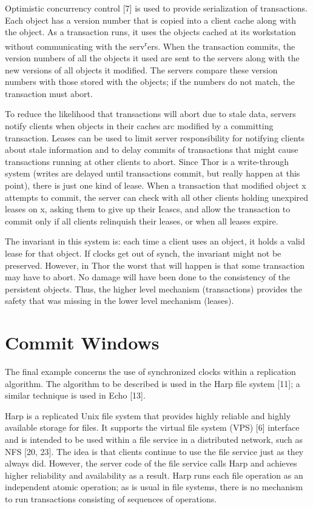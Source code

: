 \documentclass[a4paper,11pt,notitlepage,twoside,openright]{article}
\begin{document}
Optimistic concurrency control {[}7{]} is used to provide serialization
of transactions. Each object has a version number that is copied into a
client cache along with the object. As a transaction runs, it uses the
objects cached at its workstation without communicating with the
serv\textsuperscript{r}ers. When the transaction commits, the version
numbers of all the objects it used are sent to the servers along with
the new versions of all objects it modified. The servers compare these
version numbers with those stored with the objects; if the numbers do
not match, the transaction must abort.

To reduce the likelihood that transactions will abort due to stale data,
servers notify clients when objects in their caches arc modified by a
committing transaction. Leases can be used to limit server
responsibility for notifying clients about stale information and to
delay commits of transactions that might cause transactions running at
other clients to abort. Since Thor is a write-through system (writes are
delayed until transactions commit, but really happen at this point),
there is just one kind of lease. When a transaction that modified object
x attempts to commit, the server can check with all other clients
holding unexpired leases on x, asking them to give up their Icascs, and
allow the transaction to commit only if all clients relinquish their
leases, or when all leases expire.

The invariant in this system is: each time a client uses an object, it
holds a valid lease for that object. If clocks get out of synch, the
invariant might not be preserved. However, in Thor the worst that will
happen is that some transaction may have to abort. No damage will have
been done to the consistency of the persistent objects. Thus, the higher
level mechanism (transactions) provides the safety that was missing in
the lower level mechanism (leases).


\hypertarget{commit-windows}{%
\section{Commit Windows}\label{commit-windows}}


The final example concerns the use of synchronized clocks within a
replication algorithm. The algorithm to be described is used in the Harp
file system {[}11{]}; a similar technique is used in Echo {[}13{]}.

Harp is a replicated Unix file system that provides highly reliable and
highly available storage for files. It supports the virtual file system
(VPS) {[}6{]} interface and is intended to be used within a file service
in a distributed
network, such as NFS {[}20, 23{]}. The idea is that clients continue to
use the file service just as they always did. However, the server code
of the file service calls Harp and achieves higher reliability and
availability as a result. Harp runs each file operation as an
independent atomic operation; as is usual in file systems, there is no
mechanism to run transactions consisting of sequences of operations.
\end{document}
